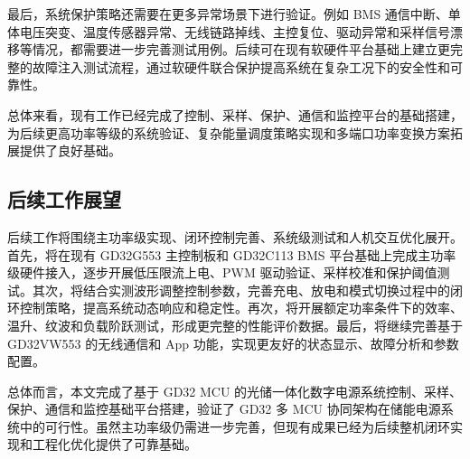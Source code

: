 最后，系统保护策略还需要在更多异常场景下进行验证。例如 BMS 通信中断、单体电压突变、温度传感器异常、无线链路掉线、主控复位、驱动异常和采样信号漂移等情况，都需要进一步完善测试用例。后续可在现有软硬件平台基础上建立更完整的故障注入测试流程，通过软硬件联合保护提高系统在复杂工况下的安全性和可靠性。

总体来看，现有工作已经完成了控制、采样、保护、通信和监控平台的基础搭建，为后续更高功率等级的系统验证、复杂能量调度策略实现和多端口功率变换方案拓展提供了良好基础。
\subsection{后续工作展望}

后续工作将围绕主功率级实现、闭环控制完善、系统级测试和人机交互优化展开。首先，将在现有 GD32G553 主控制板和 GD32C113 BMS 平台基础上完成主功率级硬件接入，逐步开展低压限流上电、PWM 驱动验证、采样校准和保护阈值测试。其次，将结合实测波形调整控制参数，完善充电、放电和模式切换过程中的闭环控制策略，提高系统动态响应和稳定性。再次，将开展额定功率条件下的效率、温升、纹波和负载阶跃测试，形成更完整的性能评价数据。最后，将继续完善基于 GD32VW553 的无线通信和 App 功能，实现更友好的状态显示、故障分析和参数配置。

总体而言，本文完成了基于 GD32 MCU 的光储一体化数字电源系统控制、采样、保护、通信和监控基础平台搭建，验证了 GD32 多 MCU 协同架构在储能电源系统中的可行性。虽然主功率级仍需进一步完善，但现有成果已经为后续整机闭环实现和工程化优化提供了可靠基础。